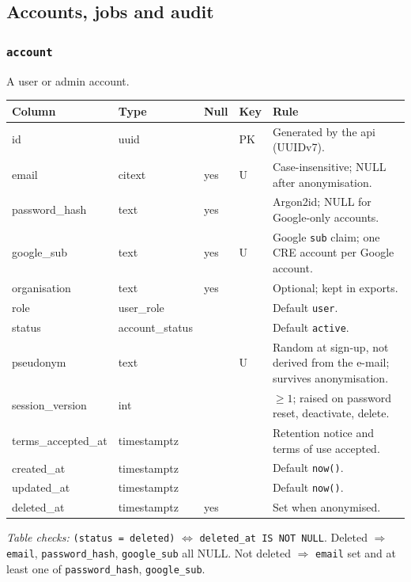 \documentclass[11pt,a4paper]{article}
\begin{document}
\subsection{Accounts, jobs and audit}
\subsubsection*{\texttt{account}}
\noindent A user or admin account.\par\vspace{2pt}
{\footnotesize\setlength{\tabcolsep}{4pt}\noindent\begin{tabularx}{\linewidth}{@{}>{\ttfamily\raggedright\arraybackslash}p{3.2cm} >{\ttfamily\raggedright\arraybackslash}p{3.15cm} >{\centering\arraybackslash}p{0.6cm} >{\raggedright\arraybackslash}p{3.85cm} Y@{}}
\toprule{}\normalfont Column & \normalfont Type & Null & Key & Rule \\ \midrule
id & uuid &  & PK & Generated by the api (UUIDv7). \\
email & citext & yes & U & Case-insensitive; NULL after anonymisation. \\
password\_hash & text & yes &  & Argon2id; NULL for Google-only accounts. \\
google\_sub & text & yes & U & Google \texttt{sub} claim; one CRE account per Google account. \\
organisation & text & yes &  & Optional; kept in exports. \\
role & user\_role &  &  & Default \texttt{user}. \\
status & account\_status &  &  & Default \texttt{active}. \\
pseudonym & text &  & U & Random at sign-up, not derived from the e-mail; survives anonymisation. \\
session\_version & int &  &  & $\ge 1$; raised on password reset, deactivate, delete. \\
terms\_accepted\_at & timestamptz &  &  & Retention notice and terms of use accepted. \\
created\_at & timestamptz &  &  & Default \texttt{now()}. \\
updated\_at & timestamptz &  &  & Default \texttt{now()}. \\
deleted\_at & timestamptz & yes &  & Set when anonymised. \\
\bottomrule\end{tabularx}}
{\footnotesize\noindent\textit{Table checks:} \texttt{(status = deleted)} $\Leftrightarrow$ \texttt{deleted\_at IS NOT NULL}. Deleted $\Rightarrow$ \texttt{email}, \texttt{password\_hash}, \texttt{google\_sub} all NULL. Not deleted $\Rightarrow$ \texttt{email} set and at least one of \texttt{password\_hash}, \texttt{google\_sub}.\par}
\end{document}
